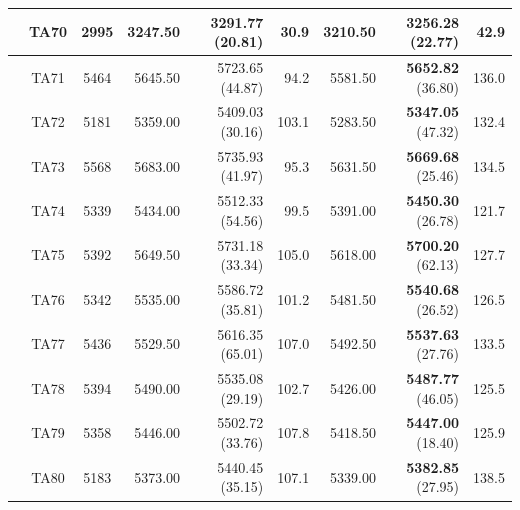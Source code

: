 \documentclass[icae]{iosart2x}
\begin{document}
\begin{appendix}
\begin{table}[htb]
\begin{tabular}{c|c|c|rrr|rrr}
 & TA70 & 2995 & 3247.50 & 3291.77 \tiny{(20.81)} & 30.9 & 3210.50 & \textbf{3256.28} \tiny{(22.77)} & 42.9\\
\midrule
\parbox[t]{2mm}{}
 & TA71 & 5464 & 5645.50 & 5723.65 \tiny{(44.87)} & 94.2 & 5581.50 & \textbf{5652.82} \tiny{(36.80)} & 136.0\\
 & TA72 & 5181 & 5359.00 & 5409.03 \tiny{(30.16)} & 103.1 & 5283.50 & \textbf{5347.05} \tiny{(47.32)} & 132.4\\
 & TA73 & 5568 & 5683.00 & 5735.93 \tiny{(41.97)} & 95.3 & 5631.50 & \textbf{5669.68} \tiny{(25.46)} & 134.5\\
 & TA74 & 5339 & 5434.00 & 5512.33 \tiny{(54.56)} & 99.5 & 5391.00 & \textbf{5450.30} \tiny{(26.78)} & 121.7\\
 & TA75 & 5392 & 5649.50 & 5731.18 \tiny{(33.34)} & 105.0 & 5618.00 & \textbf{5700.20} \tiny{(62.13)} & 127.7\\
 & TA76 & 5342 & 5535.00 & 5586.72 \tiny{(35.81)} & 101.2 & 5481.50 & \textbf{5540.68} \tiny{(26.52)} & 126.5\\
 & TA77 & 5436 & 5529.50 & 5616.35 \tiny{(65.01)} & 107.0 & 5492.50 & \textbf{5537.63} \tiny{(27.76)} & 133.5\\
 & TA78 & 5394 & 5490.00 & 5535.08 \tiny{(29.19)} & 102.7 & 5426.00 & \textbf{5487.77} \tiny{(46.05)} & 125.5\\
 & TA79 & 5358 & 5446.00 & 5502.72 \tiny{(33.76)} & 107.8 & 5418.50 & \textbf{5447.00} \tiny{(18.40)} & 125.9\\
 & TA80 & 5183 & 5373.00 & 5440.45 \tiny{(35.15)} & 107.1 & 5339.00 & \textbf{5382.85} \tiny{(27.95)} & 138.5\\
\bottomrule
\end{tabular}
\end{table}
\end{appendix}
\end{document}
